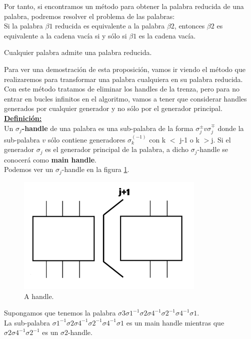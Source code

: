 Por tanto, si encontramos un método para obtener la palabra reducida de una palabra, podremos resolver el problema de las palabras: \\
Si la palabra $\beta1$ reducida es equivalente a la palabra $\beta2$, entonces $\beta2$ es equivalente a la cadena vacía si y sólo si $\beta1$ es la cadena vacía. \\

\begin{pro}
	Cualquier palabra admite una palabra reducida. 
\end{pro}

Para ver una demostración de esta proposición, vamos ir viendo el método que realizaremos para transformar una palabra cualquiera en su palabra reducida.\\ 
Con este método tratamos de eliminar los handles de la trenza, pero para no entrar en bucles infinitos en el algoritmo, vamos a tener que considerar handles generados por cualquier generador y no sólo por el generador principal.\\

\underline{\textbf{Definición:}}\\
 Un \textbf{$ \sigma_{j} $-handle} de una palabra es una sub-palabra de la forma $ \sigma_{j}^{\pm} v \sigma_{j}^{\mp} $ donde la sub-palabra $v$ sólo contiene generadores $\sigma_{k}^{(-1)} $ con k $<$ j-1 o k $>$j. Si el generador $\sigma_{j}$ es el generador principal de la palabra, a dicho $ \sigma_{j} $-handle se conocerá como \textbf{main handle}.\\
 
 Podemos ver un $ \sigma_{j} $-handle en la figura \ref{h2}.\\
 \begin{figure}[h!]
 	\centering
 	\includegraphics[width=9cm]{itrenzas/h12.png}
 	\caption{A handle.}
 	\label{h2} 
 \end{figure}
 
 Supongamos que tenemos la palabra $ \sigma3\sigma1^{-1}\sigma2\sigma4^{-1}\sigma2^{-1}\sigma4^{-1}\sigma1 $. \\
 La sub-palabra $ \sigma1^{-1}\sigma2\sigma4^{-1}\sigma2^{-1}\sigma4^{-1}\sigma1 $ es un main handle mientras que $\sigma2\sigma4^{-1}\sigma2^{-1} $ es un $ \sigma2 $-handle.\\
 
